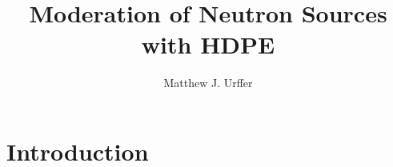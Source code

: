 \documentclass[draftcls,onecolumn]{IEEEtran}
\begin{document}
\title{Moderation of Neutron Sources with HDPE}
\author{Matthew J. Urffer}

\maketitle


\listoftodos
\pagebreak
\tableofcontents
\pagebreak
\listoffigures
\pagebreak
\listoftables
\pagebreak
\lstlistoflistings

\section{Introduction}



\appendix

%
\end{document}

